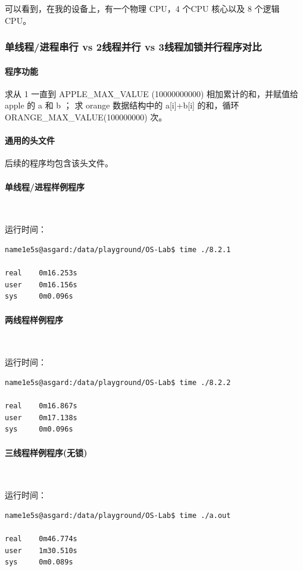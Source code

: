 \documentclass[blue,normal,cn]{elegantnote}
\begin{document}
可以看到，在我的设备上，有一个物理 CPU，4 个CPU 核心以及 8 个逻辑 CPU。
\subsubsection{单线程/进程串行 vs 2线程并行 vs 3线程加锁并行程序对比}
\paragraph{程序功能}
求从 1 一直到 APPLE\_MAX\_VALUE (10000000000) 
相加累计的和，并赋值给 apple 的 a 和 b ；
求 orange 数据结构中的 a[i]+b[i] 的和，循环 
ORANGE\_MAX\_VALUE(100000000) 次。

\paragraph{通用的头文件}
后续的程序均包含该头文件。


\paragraph{单线程/进程样例程序}
\ 

运行时间：
\begin{lstlisting}
name1e5s@asgard:/data/playground/OS-Lab$ time ./8.2.1 

real    0m16.253s
user    0m16.156s
sys     0m0.096s
\end{lstlisting}

\paragraph{两线程样例程序}
\ 

运行时间：
\begin{lstlisting}
name1e5s@asgard:/data/playground/OS-Lab$ time ./8.2.2 

real    0m16.867s
user    0m17.138s
sys     0m0.096s
\end{lstlisting}

\paragraph{三线程样例程序(无锁)}
\ 

运行时间：
\begin{lstlisting}
name1e5s@asgard:/data/playground/OS-Lab$ time ./a.out 

real    0m46.774s
user    1m30.510s
sys     0m0.089s
\end{lstlisting}
\end{document}
